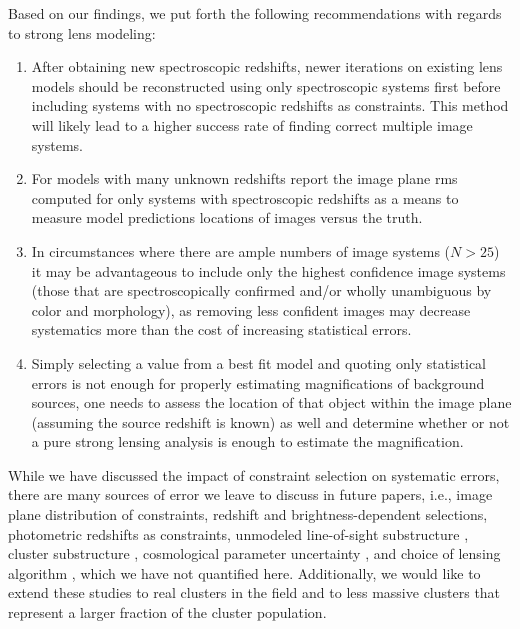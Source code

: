 Based on our findings, we put forth the following recommendations with regards to strong lens modeling:

\begin{enumerate}
\item  After obtaining new spectroscopic redshifts, newer iterations on existing lens models should be reconstructed using only spectroscopic systems first before including systems with no spectroscopic redshifts as constraints. This method will likely lead to a higher success rate of finding correct multiple image systems.
\item For models with many unknown redshifts report the image plane rms computed for only systems with spectroscopic redshifts as a means to measure model predictions locations of images versus the truth.
\item In circumstances where there are ample numbers of image systems ($N>25$) it may be advantageous to include only the highest confidence image systems (those that are spectroscopically confirmed and/or wholly unambiguous by color and morphology), as removing less confident images may decrease systematics more than the cost of increasing statistical errors.
\item Simply selecting a value from a best fit model and quoting only statistical errors is not enough for properly estimating magnifications of background sources, one needs to assess the location of that object within the image plane (assuming the source redshift is known) as well and determine whether or not a pure strong lensing analysis is enough to estimate the magnification.
\end{enumerate}

While we have discussed the impact of constraint selection on systematic errors, there are many sources of error we leave to discuss in future papers, i.e., image plane distribution of constraints, redshift and brightness-dependent selections, photometric redshifts as constraints, unmodeled line-of-sight substructure \citep[e.g.,][]{DAloisio:2014vl}, cluster substructure \citep[e.g.,][]{Limousin:2007fk}, cosmological parameter uncertainty \citep[e.g.,][]{Bayliss:2015lr}, and choice of lensing algorithm \citep{Meneghetti:2016xe}, which we have not quantified here. Additionally, we would like to extend these studies to real clusters in the field and to less massive clusters that represent a larger fraction of the cluster population.
